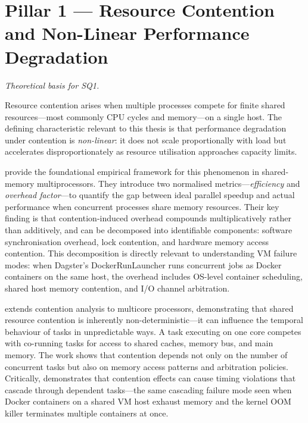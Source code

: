 
\section{Pillar 1 --- Resource Contention and Non-Linear Performance Degradation}
\label{sec:pillar1}

\emph{Theoretical basis for SQ1.}

Resource contention arises when multiple processes compete for finite shared resources---most commonly CPU cycles and memory---on a single host. The defining characteristic relevant to this thesis is that performance degradation under contention is \emph{non-linear}: it does not scale proportionally with load but accelerates disproportionately as resource utilisation approaches capacity limits.

\citet{nanda1991} provide the foundational empirical framework for this phenomenon in shared-memory multiprocessors. They introduce two normalised metrics---\emph{efficiency} and \emph{overhead factor}---to quantify the gap between ideal parallel speedup and actual performance when concurrent processes share memory resources. Their key finding is that contention-induced overhead compounds multiplicatively rather than additively, and can be decomposed into identifiable components: software synchronisation overhead, lock contention, and hardware memory access contention. This decomposition is directly relevant to understanding VM failure modes: when Dagster's DockerRunLauncher runs concurrent jobs as Docker containers on the same host, the overhead includes OS-level container scheduling, shared host memory contention, and I/O channel arbitration.

\citet{arora2023} extends contention analysis to multicore processors, demonstrating that shared resource contention is inherently non-deterministic---it can influence the temporal behaviour of tasks in unpredictable ways. A task executing on one core competes with co-running tasks for access to shared caches, memory bus, and main memory. The work shows that contention depends not only on the number of concurrent tasks but also on memory access patterns and arbitration policies. Critically, \citeauthor{arora2023} demonstrates that contention effects can cause timing violations that cascade through dependent tasks---the same cascading failure mode seen when Docker containers on a shared VM host exhaust memory and the kernel OOM killer terminates multiple containers at once.

